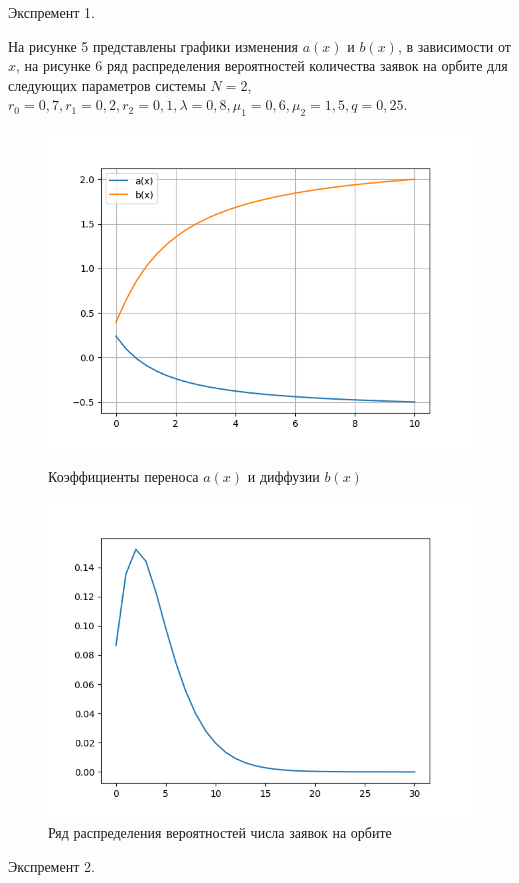 
Экспремент 1.

На рисунке 5 представлены графики изменения $a(x)$ и $b(x)$, в зависимости от $x$, на рисунке 6 ряд распределения вероятностей количества заявок на орбите для следующих параметров системы $N=2$, $r_{0}=0,7, r_{1}=0,2, r_{2}=0,1, \lambda=0,8, \mu_{1}=0,6, \mu_{2}=1,5, q=0,25.$

\begin{figure}[H]
	\centering
	\begin{minipage}[h]{0.49\linewidth}
		\includegraphics[width=0.8\linewidth]{ab2} 	
		\caption{Коэффициенты переноса $a(x)$ и диффузии $b(x)$}
		\label{ris:experimoriginal}
	\end{minipage}
	\hfill
	\begin{minipage}[h]{0.49\linewidth}
		\includegraphics[width=0.8\linewidth]{P2} 
		\caption{Ряд распределения вероятностей числа заявок на орбите}
		\label{ris:experimcoded}
	\end{minipage}
\end{figure}
\noindent Экспремент 2.

